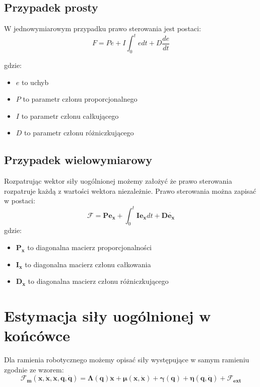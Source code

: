 \subsection{Przypadek prosty}
W jednowymiarowym przypadku prawo sterowania jest postaci:
\begin{equation}
F = Pe + I\int_{0}^{t}e dt + D\frac{de}{dt}
\end{equation}

gdzie:
\begin{itemize}
	\item $e$ to uchyb
	\item $P$ to parametr członu proporcjonalnego
	\item $I$ to parametr członu całkującego
	\item $D$ to parametr członu różniczkującego
\end{itemize}


\subsection{Przypadek wielowymiarowy}
Rozpatrując wektor siły uogólnionej możemy założyć że prawo sterowania rozpatruje każdą z wartości wektora niezależnie. Prawo sterowania można zapisać w postaci:
\begin{equation}
\boldsymbol{\mathcal{F}} = \boldsymbol{P}\boldsymbol{e_x} +\int_{0}^{t}  \boldsymbol{I}\boldsymbol{e_x}dt + \boldsymbol{D}\dot{\boldsymbol{e_x}}
\end{equation}
gdzie:
\begin{itemize}
	\item $\boldsymbol{P_x}$ to diagonalna macierz proporcjonalności
	\item $\boldsymbol{I_x}$ to diagonalna macierz członu całkowania
	\item $\boldsymbol{D_x}$ to diagonalna macierz członu różniczkującego
\end{itemize}

\section{Estymacja siły uogólnionej w końcówce}
Dla ramienia robotycznego możemy opisać siły występujące w samym ramieniu zgodnie ze wzorem:
\begin{equation}
\boldsymbol{\mathcal{F}_m}(\boldsymbol{x}, \dot{\boldsymbol{x}}, \ddot{\boldsymbol{x}}, \boldsymbol{q}, \dot{\boldsymbol{q}}) = \boldsymbol{\Lambda}(\boldsymbol{q})\boldsymbol{\ddot{x}} + \boldsymbol{\mu}(\boldsymbol{x}, \boldsymbol{\dot{x}}) + \boldsymbol{\gamma}(\boldsymbol{q}) + \boldsymbol{\eta}(\boldsymbol{q}, \boldsymbol{\dot{q}}) + \boldsymbol{\mathcal{F}_{ext}}
\label{eq:ramie}
\end{equation}

